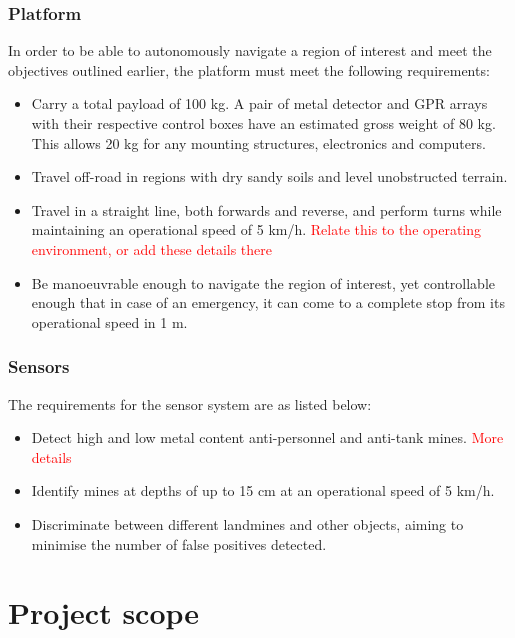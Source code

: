 \documentclass[main.tex]{subfiles}
\begin{document}
\subsubsection{Platform}
In order to be able to autonomously navigate a region of interest and meet the objectives outlined earlier, the platform must meet the following requirements: 
\begin{itemize}
 \item Carry a total payload of 100 kg. A pair of metal detector and GPR arrays with their respective control boxes have an estimated gross weight of 80 kg. This allows 20 kg for any mounting structures,  electronics and computers. 
 \item Travel off-road in regions with dry sandy soils and level unobstructed terrain.
\item Travel in a straight line, both forwards and reverse, and perform turns while maintaining an operational speed of 5 km/h. \textcolor{red}{Relate this to the operating environment, or add these details there}
\item Be manoeuvrable enough to navigate the region of interest, yet controllable enough that in case of an emergency, it can come to a complete stop from its operational speed in 1 m.
\end{itemize}

\subsubsection{Sensors}
The requirements for the sensor system are as listed below:
\begin{itemize}
\item Detect high and low metal content anti-personnel and anti-tank mines. \textcolor{red}{More details}
\item Identify mines at depths of up to 15 cm at an operational speed of 5 km/h.
\item Discriminate between different landmines and other objects, aiming to minimise the number of false positives detected.
\end{itemize}

\section{Project scope}

\end{document}
